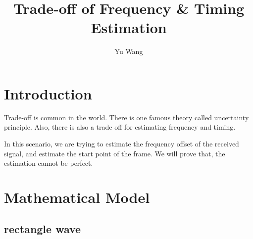 \documentclass[journal]{IEEEtran}
\begin{document}
\title{Trade-off of Frequency \& Timing Estimation}

\author{Yu Wang%
}

\maketitle

\section{Introduction} %
\label{sec:introduction}
	Trade-off is common in the world. There is one famous theory called uncertainty principle\cite{Uncertainty_Principle}. Also, there is also a trade off for estimating frequency and timing.

	In this scenario, we are trying to estimate the frequency offset of the received signal, and estimate the start point of the frame. We will prove that, the estimation cannot be perfect.

\section{Mathematical Model} %
\label{sec:mathematical_model}
\subsection{rectangle wave} %
\label{sub:rectangle_wave}
\end{document}
